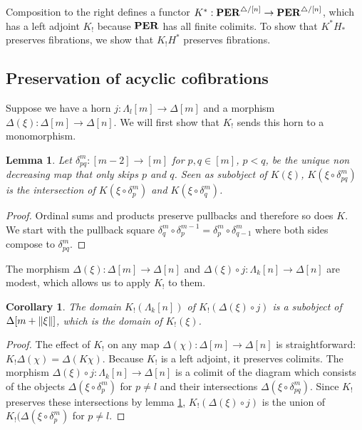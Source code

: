 \documentclass{amsart}
\theoremstyle{plain}
\newtheorem{lemma}[theorem]{Lemma}
\newtheorem{corol}[theorem]{Corollary}
\theoremstyle{definition}
\newcommand\hide[1]{}
\newcommand\ri{^*}
\begin{document}
Composition to the right defines a functor $K^*:\mathbf{PER}^{{\mathord{\triangle}}/[n]}\to\mathbf{PER}^{{\mathord{\triangle}}/[n]}$, which has a left adjoint $K_!$ because $\mathbf{PER}$ has all finite colimits. %
To show that $K^*H_*$ preserves fibrations, we show that $K_!H^*$ preserves fibrations.

\hide{
Because $\pers^{\simcat/[n]\dual}$ is complete and internal, it is also cocomplete: the colimiting cocone is a limit of all cocones and this limit actually exists. Hence $\hat K\ri$ has a left adjoint $\hat K_!$ and $H\ri(\hat K_!)$ is left adjoint to $\hat K\ri H_*$. All we need to show, is that $H\ri(\hat K_!)$ sends (the counterparts of) horn inclusions $\Lambda_l[m] \to\Delta[m]$ to acyclic cofibrations. Its right adjoint then preserves fibrations.}

\subsection{Preservation of acyclic cofibrations}
Suppose we have a horn $j:\Lambda_l[m] \to \Delta[m]$ and a morphism $\Delta(\xi):\Delta[m] \to\Delta[n]$. We will first show that $K_!$ sends this horn to a monomorphism.

\hide{wat is wat!?}
\begin{lemma} Let $\delta^m_{pq}:[m-2]\to[m]$ for $p,q\in[m]$, $p<q$, be the unique non decreasing map that only skips $p$ and $q$. Seen as subobject of $K(\xi)$, $K(\xi\circ\delta^m_{pq})$ is the intersection of $K(\xi\circ\delta^m_{p})$ and $K(\xi\circ\delta^m_{q})$. \label{intersection}\end{lemma}%

\begin{proof} Ordinal sums and products preserve pullbacks and therefore so does $K$. We start with the pullback square $\delta^m_q\circ \delta^{m-1}_p = \delta^m_p\circ \delta^m_{q-1}$ where both sides compose to $\delta^m_{pq}$. \end{proof}

The morphism $\Delta(\xi):\Delta[m] \to \Delta[n]$ and $\Delta(\xi)\circ j:\Lambda_k[n]\to \Delta[n]$ are modest, which allows us to apply $K_!$ to them.

\begin{corol} The domain $K_!(\Lambda_k[n])$ of $K_!(\Delta(\xi)\circ j)$ is a subobject of $\Delta[m+\left\Vert\xi\right\Vert]$, which is the domain of $K_!(\xi)$. \end{corol}

\begin{proof} The effect of $K_!$ on any map $\Delta(\chi):\Delta[m]\to\Delta[n]$ is straightforward: $K_!\Delta(\chi)=\Delta(K\chi)$. Because $K_!$ is a left adjoint, it preserves colimits. The morphism $\Delta(\xi)\circ j:\Lambda_k[n]\to\Delta[n]$ is a colimit of the diagram which consists of the objects $\Delta(\xi\circ\delta^m_{p})$ for $p\neq l$ and their intersections $\Delta(\xi\circ\delta^m_{pq})$. Since $K_!$ preserves these intersections by lemma \ref{intersection}, $K_!(\Delta(\xi)\circ j)$ is the union of $K_!(\Delta(\xi\circ\delta^m_p)$ for $p\neq l$. \end{proof}
\end{document}
